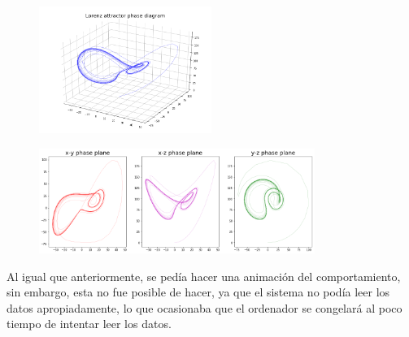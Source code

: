 \documentclass{article}
\begin{document}
\begin{figure}[H]
    \includegraphics[width=0.5\textwidth]{Visualizacion3.png}
    \centering
    \label{Grad}
\end{figure}

\begin{figure}[H]
    \includegraphics[width=0.8\textwidth]{GraficasTriples3.png}
    \centering
    \label{Grad}
\end{figure}

Al igual que anteriormente, se pedía hacer una animación del comportamiento, sin embargo, esta no fue posible de hacer, ya que el sistema no podía leer los datos apropiadamente, lo que ocasionaba que el ordenador se congelará al poco tiempo de intentar leer los datos.
\end{document}
